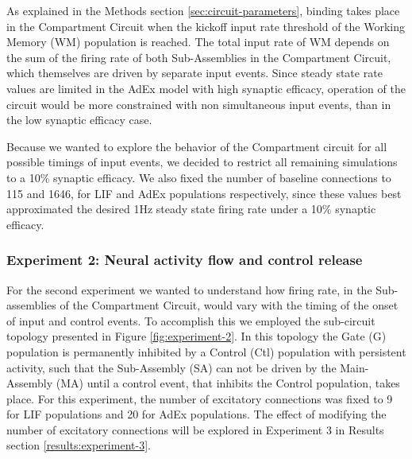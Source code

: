 \documentclass[10pt]{article}
\begin{document}
As explained in the Methods section \ref{sec:circuit-parameters},
binding takes place in the Compartment Circuit when the kickoff input rate threshold of the Working Memory (WM) population is reached.
The total input rate of WM depends on the sum of the firing rate of both Sub-Assemblies in the Compartment Circuit, which themselves are driven by separate input events.
Since steady state rate values are limited in the AdEx model with high synaptic efficacy, operation of the circuit would be more constrained with non simultaneous input events, than in the low synaptic efficacy case.

Because we wanted to explore the behavior of the Compartment circuit for all possible timings of input events, we decided to restrict all remaining simulations to a 10\% synaptic efficacy.
We also fixed the number of baseline connections to 115 and 1646, for LIF and AdEx populations respectively, since these values best approximated the desired 1Hz steady state firing rate under a 10\% synaptic efficacy.


\subsubsection{Experiment 2: Neural activity flow and control
  release}\label{sec:experiment-2}

For the second experiment we wanted to understand how firing rate, in the Sub-assemblies of the Compartment Circuit, would vary with the timing of the onset of input and control events.
To accomplish this we employed the sub-circuit topology presented in Figure \ref{fig:experiment-2}.
In this topology the Gate (G) population is permanently inhibited by a Control (Ctl) population with persistent activity, such that the Sub-Assembly (SA) can not be driven by the Main-Assembly (MA) until a control event, that inhibits the Control population, takes place.
For this experiment, the number of excitatory connections was fixed to 9 for LIF populations and 20 for AdEx populations.
The effect of modifying the number of excitatory connections will be explored in Experiment 3 in Results section \ref{results:experiment-3}.
\end{document}
